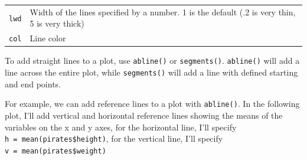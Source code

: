 \documentclass[]{book}
\newenvironment{Shaded}{\begin{snugshade}}{\end{snugshade}}
\newcommand{\KeywordTok}[1]{\textcolor[rgb]{0.13,0.29,0.53}{\textbf{#1}}}
\newcommand{\DataTypeTok}[1]{\textcolor[rgb]{0.13,0.29,0.53}{#1}}
\newcommand{\DecValTok}[1]{\textcolor[rgb]{0.00,0.00,0.81}{#1}}
\newcommand{\StringTok}[1]{\textcolor[rgb]{0.31,0.60,0.02}{#1}}
\newcommand{\CommentTok}[1]{\textcolor[rgb]{0.56,0.35,0.01}{\textit{#1}}}
\newcommand{\OperatorTok}[1]{\textcolor[rgb]{0.81,0.36,0.00}{\textbf{#1}}}
\newcommand{\NormalTok}[1]{#1}
\theoremstyle{definition}
\theoremstyle{definition}
\theoremstyle{remark}
\begin{document}
\begin{longtable}[]{@{}ll@{}}
\begin{minipage}[t]{0.14\columnwidth}
\texttt{lwd}\strut
\end{minipage} & \begin{minipage}[t]{0.50\columnwidth}\raggedright\strut
Width of the lines specified by a number. 1 is the default (.2 is very
thin, 5 is very thick)\strut
\end{minipage}\tabularnewline
\begin{minipage}[t]{0.14\columnwidth}\raggedright\strut
\texttt{col}\strut
\end{minipage} & \begin{minipage}[t]{0.50\columnwidth}\raggedright\strut
Line color\strut
\end{minipage}\tabularnewline
\bottomrule
\end{longtable}

To add straight lines to a plot, use \texttt{abline()} or
\texttt{segments()}. \texttt{abline()} will add a line across the entire
plot, while \texttt{segments()} will add a line with defined starting
and end points.

For example, we can add reference lines to a plot with
\texttt{abline()}. In the following plot, I'll add vertical and
horizontal reference lines showing the means of the variables on the x
and y axes, for the horizontal line, I'll specify
\texttt{h\ =\ mean(pirates\$height)}, for the vertical line, I'll
specify \texttt{v\ =\ mean(pirates\$weight)}

\begin{Shaded}
\end{Shaded}
\end{document}
